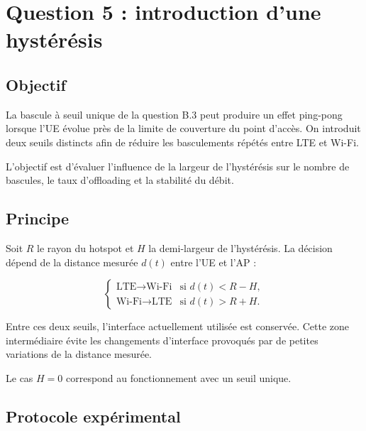 

\section{Question 5 : introduction d'une hystérésis}

\subsection{Objectif}

La bascule à seuil unique de la question B.3 peut produire un effet
ping-pong lorsque l'UE évolue près de la limite de couverture du point
d'accès. On introduit deux seuils distincts afin de réduire les
basculements répétés entre LTE et Wi-Fi.

L'objectif est d'évaluer l'influence de la largeur de l'hystérésis sur
le nombre de bascules, le taux d'offloading et la stabilité du débit.

\subsection{Principe}

Soit $R$ le rayon du hotspot et $H$ la demi-largeur de l'hystérésis.
La décision dépend de la distance mesurée $d(t)$ entre l'UE et l'AP :

\begin{equation}
\begin{cases}
\text{LTE} \rightarrow \text{Wi-Fi}
& \text{si } d(t) < R-H,\\[2pt]
\text{Wi-Fi} \rightarrow \text{LTE}
& \text{si } d(t) > R+H.
\end{cases}
\end{equation}

Entre ces deux seuils, l'interface actuellement utilisée est conservée.
Cette zone intermédiaire évite les changements d'interface provoqués
par de petites variations de la distance mesurée.

Le cas $H=0$ correspond au fonctionnement avec un seuil unique.

\subsection{Protocole expérimental}

